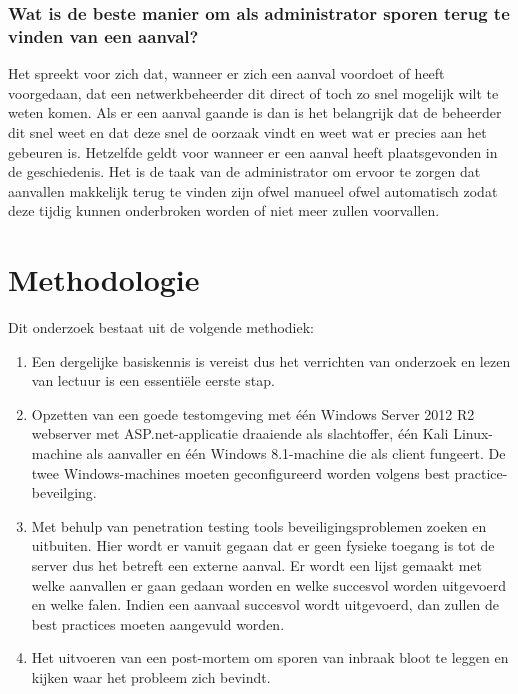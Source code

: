 \documentclass[pdftex,a4paper,12pt]{report}
\begin{document}
\subsection{Wat is de beste manier om als administrator sporen terug te vinden van een aanval?}

Het spreekt voor zich dat, wanneer er zich een aanval voordoet of heeft voorgedaan, dat een netwerkbeheerder dit direct of toch zo snel mogelijk wilt te weten komen. Als er een aanval gaande is dan is het belangrijk dat de beheerder dit snel weet en dat deze snel de oorzaak vindt en weet wat er precies aan het gebeuren is. Hetzelfde geldt voor wanneer er een aanval heeft plaatsgevonden in de geschiedenis. Het is de taak van de administrator om ervoor te zorgen dat aanvallen makkelijk terug te vinden zijn ofwel manueel ofwel automatisch zodat deze tijdig kunnen onderbroken worden of niet meer zullen voorvallen.

\chapter{Methodologie}
\label{ch:methodologie}


Dit onderzoek bestaat uit de volgende methodiek:
\begin{enumerate}
	\item Een dergelijke basiskennis is vereist dus het verrichten van onderzoek en lezen van lectuur is een essentiële eerste stap.
	\item Opzetten van een goede testomgeving met één Windows Server 2012 R2 webserver met ASP.net-applicatie draaiende als slachtoffer, één Kali Linux-machine als aanvaller en één Windows 8.1-machine die als client fungeert. De twee Windows-machines moeten geconfigureerd worden volgens best practice-beveilging.
	\item Met behulp van penetration testing tools beveiligingsproblemen zoeken en uitbuiten. Hier wordt er vanuit gegaan dat er geen fysieke toegang is tot de server dus het betreft een externe aanval. Er wordt een lijst gemaakt met welke aanvallen er gaan gedaan worden en welke succesvol worden uitgevoerd en welke falen. Indien een aanvaal succesvol wordt uitgevoerd, dan zullen de best practices moeten aangevuld worden.
	\item Het uitvoeren van een post-mortem om sporen van inbraak bloot te leggen en kijken waar het probleem zich bevindt.
\end{enumerate}
\end{document}
